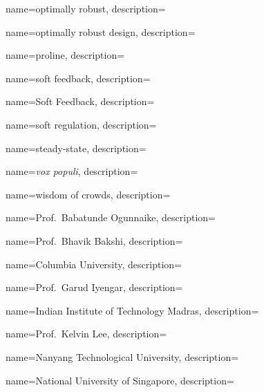 	{
		name={optimally robust},
		description={}
	}
	
	{
		name={optimally robust design},
		description={}
	}
	

	{
		name={proline},
		description={}
	}


	{
		name={soft feedback},
		description={}
	}

	{
		name={Soft Feedback},
		description={}
	}

	{
		name={soft regulation},
		description={}
	}
	
	{
		name={steady-state},
		description={}
	}	
		

	{
		name={\textit{vox populi}},
		description={}
	}	


	{
		name={wisdom of crowds},
		description={}
	}
	
	
	{
		name={Prof.~Babatunde Ogunnaike},
		description={}
	}	

	{
		name={Prof.~Bhavik Bakshi},
		description={}
	}
	
	{
		name={Columbia University},
		description={}
	}	

	{
		name={Prof.~Garud Iyengar},
		description={}
	}	
	
	{
		name={Indian Institute of Technology Madras},
		description={}
	}	

	{
		name={Prof.~Kelvin Lee},
		description={}
	}	

	{
		name={Nanyang Technological University},
		description={}
	}	

	{
		name={National University of Singapore},
		description={}
	}	

